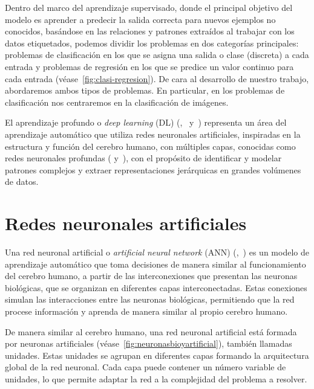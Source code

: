 Dentro del marco del aprendizaje supervisado, donde el principal objetivo del modelo es aprender a predecir la salida correcta para nuevos ejemplos no conocidos, basándose en las relaciones y patrones extraídos al trabajar con los datos etiquetados, podemos dividir los problemas en dos categorías principales: problemas de clasificación en los que se asigna una salida o clase (discreta) a cada entrada y problemas de regresión en los que se predice un valor continuo para cada entrada (véase~\autoref{fig:clasi-regresion}). De cara al desarrollo de nuestro trabajo, abordaremos ambos tipos de problemas. En particular, en los problemas de clasificación nos centraremos en la clasificación de imágenes.\newline

El aprendizaje profundo o \emph{deep learning} (DL) (\cite{Bishop2023},~\cite{Prince2023} y~\cite{LeCun2015}) representa un área del aprendizaje automático que utiliza redes neuronales artificiales, inspiradas en la estructura y función del cerebro humano, con múltiples capas, conocidas como redes neuronales profundas (\cite{Goodfellow2016} y~\cite{Schmidhuber2015}), con el propósito de identificar y modelar patrones complejos y extraer representaciones jerárquicas en grandes volúmenes de datos.\newline

\section{Redes neuronales artificiales}\label{sec:redes-neuronales-artificiales}

Una red neuronal artificial o \emph{artificial neural network} (ANN) (\cite{Bishop1995},~\cite{Ripley1996}) es un modelo de aprendizaje automático que toma decisiones de manera similar al funcionamiento del cerebro humano, a partir de las interconexiones que presentan las neuronas biológicas, que se organizan en diferentes capas interconectadas. Estas conexiones simulan las interacciones entre las neuronas biológicas, permitiendo que la red procese información y aprenda de manera similar al propio cerebro humano.\newline

De manera similar al cerebro humano, una red neuronal artificial está formada por neuronas artificiales (véase~\autoref{fig:neuronasbioyartificial}), también llamadas unidades. Estas unidades se agrupan en diferentes capas formando la arquitectura global de la red neuronal. Cada capa puede contener un número variable de unidades, lo que permite adaptar la red a la complejidad del problema a resolver.\newline

